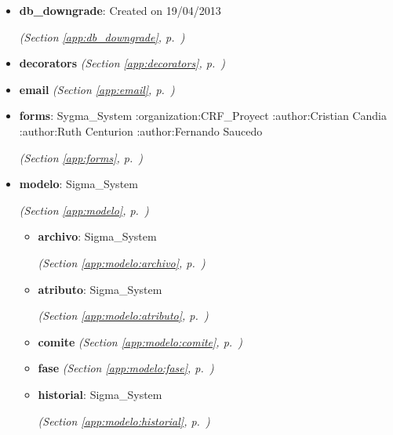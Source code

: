 \begin{itemize}
\begin{itemize}
  \end{itemize}
\item \textbf{db\_downgrade}: Created on 19/04/2013



  \textit{(Section \ref{app:db_downgrade}, p.~\pageref{app:db_downgrade})}

\item \textbf{decorators}
  \textit{(Section \ref{app:decorators}, p.~\pageref{app:decorators})}

\item \textbf{email}
  \textit{(Section \ref{app:email}, p.~\pageref{app:email})}

\item \textbf{forms}: Sygma\_System :organization:CRF\_Proyect :author:Cristian Candia 
:author:Ruth Centurion :author:Fernando Saucedo



  \textit{(Section \ref{app:forms}, p.~\pageref{app:forms})}

\item \textbf{modelo}: Sigma\_System



  \textit{(Section \ref{app:modelo}, p.~\pageref{app:modelo})}

  \begin{itemize}
\setlength{\parskip}{0ex}
    \item \textbf{archivo}: Sigma\_System



  \textit{(Section \ref{app:modelo:archivo}, p.~\pageref{app:modelo:archivo})}

    \item \textbf{atributo}: Sigma\_System



  \textit{(Section \ref{app:modelo:atributo}, p.~\pageref{app:modelo:atributo})}

    \item \textbf{comite}
  \textit{(Section \ref{app:modelo:comite}, p.~\pageref{app:modelo:comite})}

    \item \textbf{fase}
  \textit{(Section \ref{app:modelo:fase}, p.~\pageref{app:modelo:fase})}

    \item \textbf{historial}: Sigma\_System



  \textit{(Section \ref{app:modelo:historial}, p.~\pageref{app:modelo:historial})}


\end{itemize}
\end{itemize}
